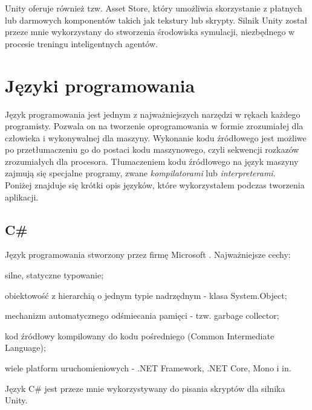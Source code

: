 Unity oferuje również tzw. Asset Store, który umożliwia skorzystanie z płatnych lub darmowych komponentów takich jak tekstury lub skrypty. Silnik Unity został przeze mnie wykorzystany do stworzenia środowiska symulacji, niezbędnego w procesie treningu inteligentnych agentów.

\section{Języki programowania}
Język programowania jest jednym z najważniejszych narzędzi w rękach każdego programisty. Pozwala on na tworzenie oprogramowania w formie zrozumiałej dla człowieka i wykonywalnej dla maszyny.
Wykonanie kodu źródłowego jest możliwe po przetłumaczeniu go do postaci kodu maszynowego, czyli sekwencji rozkazów zrozumiałych dla procesora. Tłumaczeniem kodu źródłowego na język maszyny zajmują się specjalne programy, zwane \textit{kompilatorami} lub  \textit{interpreterami}. \\
Poniżej znajduje się krótki opis języków, które wykorzystałem podczas tworzenia aplikacji.

\subsection{C\#}
Język programowania stworzony przez firmę Microsoft \cite{csharp:wikipedia}. Najważniejsze cechy:
\begin{itemize*}
\item silne, statyczne typowanie;
\item obiektowość z hierarchią o jednym typie nadrzędnym - klasa System.Object;
\item mechanizm automatycznego odśmiecania pamięci - tzw. garbage collector;
\item kod źródłowy kompilowany do kodu pośredniego (Common Intermediate Language);
\item wiele platform uruchomieniowych - .NET Framework, .NET Core, Mono i in.
\end{itemize*}
Język C\# jest przeze mnie wykorzystywany do pisania skryptów dla silnika Unity.

